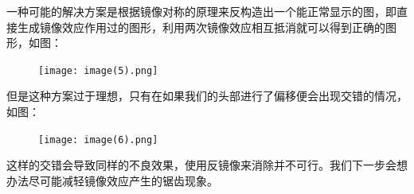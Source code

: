 \documentclass[12pt,a4paper]{article}
\begin{document}
一种可能的解决方案是根据镜像对称的原理来反构造出一个能正常显示的图，即直接生成镜像效应作用过的图形，利用两次镜像效应相互抵消就可以得到正确的图形，如图：
\begin{figure}[h!]
    \centering\texttt{[image: image(5).png]}
    \caption{}
\end{figure}

但是这种方案过于理想，只有在如果我们的头部进行了偏移便会出现交错的情况，如图：
\begin{figure}[h!]
    \centering\texttt{[image: image(6).png]}
    \caption{}
\end{figure}

这样的交错会导致同样的不良效果，使用反镜像来消除并不可行。我们下一步会想办法尽可能减轻镜像效应产生的锯齿现象。
\end{document}

